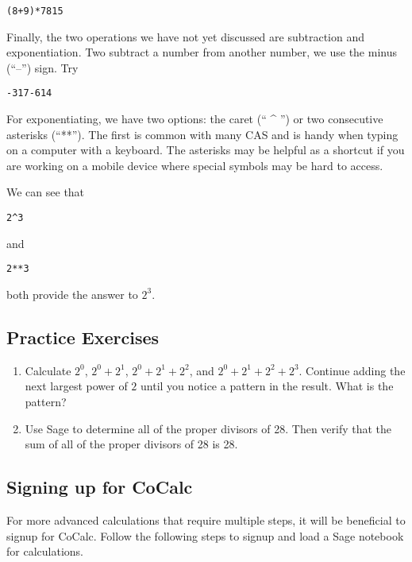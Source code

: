 \begin{verbatim}
(8+9)*7815
\end{verbatim}

Finally, the two operations we have not yet discussed are
subtraction  and exponentiation. Two
subtract a number from another number, we use the minus
(``--'') sign. Try

\begin{verbatim}
-317-614
\end{verbatim}

For exponentiating, we have two options:  the caret (`` \^{} '') or 
two consecutive asterisks (``**''). The first is common with many
CAS and is handy when typing on a computer with a keyboard.
The asterisks may be helpful as a shortcut if you are working
on a mobile device where special symbols may be hard to access.

We can see that

\begin{verbatim}
2^3
\end{verbatim}

and

\begin{verbatim}
2**3
\end{verbatim}

both provide the answer to $2^3$.

\subsection{Practice Exercises}

\begin{enumerate}
	\item Calculate $2^0$, $2^0+2^1$, $2^0+2^1+2^2$, 
		and $2^0+2^1+2^2+2^3$. Continue adding the next
		largest power of $2$ until you notice a pattern in the
		result. What is the pattern?
	\item Use Sage to determine all of the proper divisors of 28.
		Then verify that the sum of all of the proper divisors of
		28 is 28.
\end{enumerate}

\subsection{Signing up for CoCalc}

For more advanced calculations that require multiple
steps, it will be beneficial to signup for CoCalc. Follow the following
steps to signup and load a Sage notebook for calculations.

